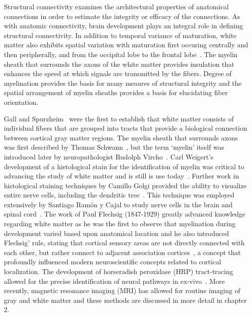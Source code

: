 Structural connectivity examines the architectural properties of anatomical connections in order to estimate the integrity or efficacy of the connections. As with anatomic connectivity, brain development plays an integral role in defining structural connectivity. In addition to temporal variance of maturation, white matter also exhibits spatial variation with maturation first occuring centrally and then peripherally, and from the occipital lobe to the frontal lobe~\cite{Gao2009}. The myelin sheath that surrounds the axons of the white matter provides insulation that enhances the speed at which signals are transmitted by the fibers. Degree of myelination provides the basis for many meaures of structural integrity and the spatial arrangement of myelin sheaths provides a basis for elucidating fiber orientation.

Gall and Spurzheim~\cite{Gall1810} were the first to establish that white matter consists of individual fibers that are grouped into tracts that provide a biological connection between cortical gray matter regions. The myelin sheath that surrounds axons was first described by Thomas Schwann~\cite{McHenry1969}, but the term `myelin' itself was introduced later by neuropathologist Rudolph Vircho~\cite{Morell1980}. Carl Weigert's development of a histological stain for the identification of myelin was critical to advancing the study of white matter and is still is use today~\cite{McHenry1969}. Further work in histological staining techniques by Camillo Golgi provided the ability to visualize entire nerve cells, including the dendritic tree~\cite{Golgi1885}. This technique was employed extensively by Santiago Ram{\'{o}}n y Cajal to study nerve cells in the brain and spinal cord~\cite{Glickstein2006}. The work of Paul Flechsig (1847-1929) greatly advanced knowledge regarding white matter as he was the first to observe that myelination during development varied based upon anatomical location and he also introduced Flechsig' rule, stating that cortical sensory areas are not directly connected with each other, but rather connect to adjacent association cortices~\cite{Flechsig1901}, a concept that profoundly influenced modern neuroscientific concepts related to cortical localization. The development of horseradish peroxidase (HRP) tract-tracing allowed for the precise identification of neural pathways in ex-vivo~\cite{Mesulam1982}. More recently, magnetic resonance imaging (MRI) has allowed for routine imaging of gray and white matter and these methods are discussed in more detail in chapter 2. 

